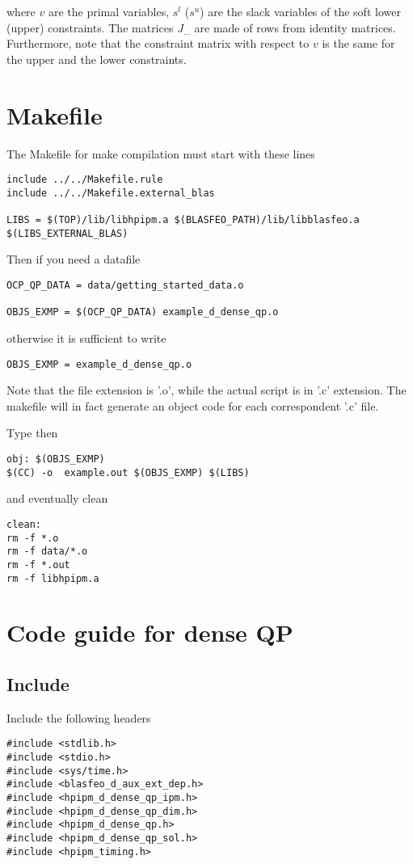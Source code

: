 \documentclass[a4paper]{article}
\begin{document}
where $v$ are the primal variables, $s^l$ ($s^u$) are the slack variables of the soft lower (upper) constraints.
The matrices $J_{\dots}$ are made of rows from identity matrices.
Furthermore, note that the constraint matrix with respect to $v$ is the same for the upper and the lower constraints.


\section{Makefile}

The Makefile for make compilation must start with these lines

\begin{verbatim}
include ../../Makefile.rule
include ../../Makefile.external_blas

LIBS = $(TOP)/lib/libhpipm.a $(BLASFEO_PATH)/lib/libblasfeo.a $(LIBS_EXTERNAL_BLAS)
\end{verbatim}

Then if you need a datafile 
\begin{verbatim}
OCP_QP_DATA = data/getting_started_data.o 

OBJS_EXMP = $(OCP_QP_DATA) example_d_dense_qp.o
\end{verbatim}
otherwise it is sufficient to write
\begin{verbatim}
OBJS_EXMP = example_d_dense_qp.o
\end{verbatim}
Note that the file extension is '.o', while the actual script is in '.c' extension. The makefile will in fact generate an object code for each correspondent '.c' file.

Type then 
\begin{verbatim}
obj: $(OBJS_EXMP)
$(CC) -o  example.out $(OBJS_EXMP) $(LIBS)
\end{verbatim}

and eventually clean 
\begin{verbatim}
clean:
rm -f *.o
rm -f data/*.o
rm -f *.out
rm -f libhpipm.a
\end{verbatim}

\section{Code guide for dense QP}
\subsection{Include}
Include the following headers
\begin{verbatim}
#include <stdlib.h>
#include <stdio.h>
#include <sys/time.h>
#include <blasfeo_d_aux_ext_dep.h>
#include <hpipm_d_dense_qp_ipm.h>
#include <hpipm_d_dense_qp_dim.h>
#include <hpipm_d_dense_qp.h>
#include <hpipm_d_dense_qp_sol.h>
#include <hpipm_timing.h>
\end{verbatim}
\end{document}
